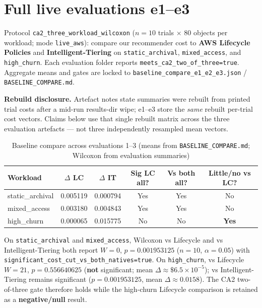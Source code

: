 \section{Full live evaluations e1--e3}

Protocol \texttt{ca2\_three\_workload\_wilcoxon}
($n{=}10$ trials $\times$ 80 objects per workload; mode \texttt{live\_aws}):
compare our recommender cost to \textbf{AWS Lifecycle Policies} and
\textbf{Intelligent-Tiering} on
\texttt{static\_archival}, \texttt{mixed\_access}, and \texttt{high\_churn}.
Each evaluation folder reports \texttt{meets\_ca2\_two\_of\_three=true}.
Aggregate means and gates are locked to
\texttt{baseline\_compare\_e1\_e2\_e3.json} /
\texttt{BASELINE\_COMPARE.md}.

\textbf{Rebuild disclosure.} Artefact notes state summaries were rebuilt from printed
trial costs after a mid-run results-dir wipe; e1--e3 store the \emph{same} rebuilt
per-trial cost vectors. Claims below use that single rebuilt matrix across the three
evaluation artefacts --- not three independently resampled mean vectors.

\begin{table}[h]
\centering
\caption{Baseline compare across evaluations 1--3
(means from \texttt{BASELINE\_COMPARE.md}; Wilcoxon from evaluation summaries)}
\label{tab:varun_baseline_e1e2e3}
\begin{tabular}{lccccc}
\hline
\textbf{Workload} & \textbf{$\Delta$ LC} & \textbf{$\Delta$ IT} & \textbf{Sig LC all?} & \textbf{Vs both all?} & \textbf{Little/no vs LC?} \\
\hline
static\_archival & 0.005119 & 0.000794 & Yes & Yes & No \\
mixed\_access & 0.003180 & 0.004843 & Yes & Yes & No \\
high\_churn & 0.000065 & 0.015775 & No & No & \textbf{Yes} \\
\hline
\end{tabular}
\end{table}

On \texttt{static\_archival} and \texttt{mixed\_access}, Wilcoxon vs Lifecycle and vs
Intelligent-Tiering both report $W{=}0$, $p{=}0.001953125$ ($n{=}10$, $\alpha{=}0.05$)
with \texttt{significant\_cost\_cut\_vs\_both\_natives=true}.
On \texttt{high\_churn}, vs Lifecycle $W{=}21$, $p{=}0.556640625$
(\textbf{not} significant; mean $\Delta{\approx}\$6.5\times10^{-5}$);
vs Intelligent-Tiering remains significant ($p{=}0.001953125$, mean $\Delta{\approx}0.0158$).
The CA2 two-of-three gate therefore holds while the high-churn Lifecycle comparison is
retained as a \textbf{negative/null} result.

